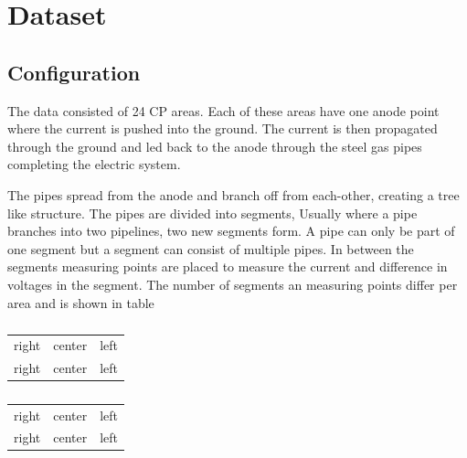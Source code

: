 
\chapter{Dataset}\label{ch:data}


\section{Configuration}
\label{sec:dataset:configuration}

The data consisted of 24 CP areas. Each of these areas have one anode point where the current is pushed into the ground. The current is then propagated through the ground and led back to the anode through the steel gas pipes completing the electric system.

The pipes spread from the anode and branch off from each-other, creating a tree like structure. The pipes are divided into segments, Usually where a pipe branches into two pipelines, two new segments form. A pipe can only be part of one segment but a segment can consist of multiple pipes. In between the segments measuring points are placed to measure the current and difference in voltages in the segment. The number of segments an measuring points differ per area and is shown in table %

\begin{table}[!htb]
\label{tab:dataset:measuring-points-per-area}
    \begin{minipage}{.5\textwidth}
        \centering
        \caption{}
        \label{tab:first}
        \begin{tabular}{rcl}
            right & center & left \\
            right & center & left 
        \end{tabular}
    \end{minipage}%
    \begin{minipage}{.5\textwidth}
        \centering
        \caption{}
        \label{tab:second}
        \begin{tabular}{rcl}
            right & center & left \\
            right & center & left 
        \end{tabular}
    \end{minipage}
\end{table}

